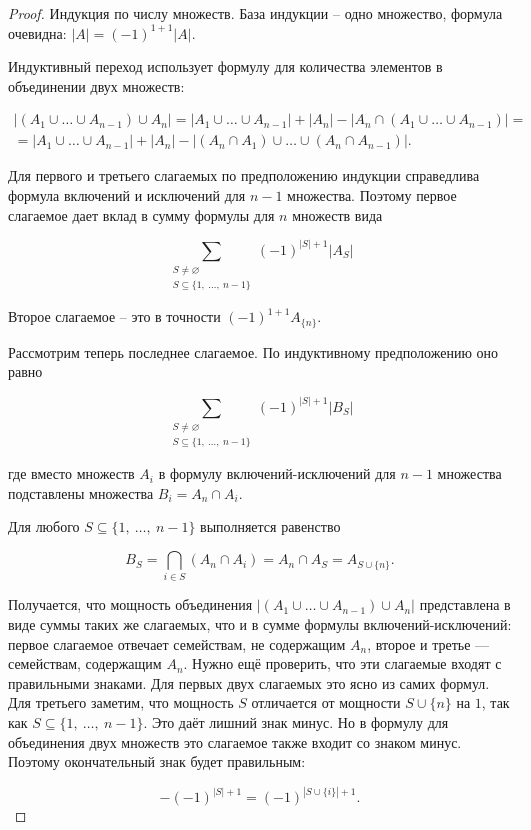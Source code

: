 \documentclass[a4paper, 12pt]{article}
\begin{document}
\begin{proof}
Индукция по числу множеств. База индукции -- одно множество, формула очевидна: $|A| = (-1)^{1 + 1}|A|$.

Индуктивный переход использует формулу для количества элементов в объединении двух множеств:

\begin{multline*}
    |(A_1 \cup \ldots \cup A_{n - 1}) \cup A_n| = |A_1 \cup \ldots \cup A_{n - 1}| + |A_n| - |A_n \cap (A_1 \cup \ldots \cup A_{n - 1})| = \\ = |A_1 \cup \ldots \cup A_{n - 1}| + |A_n| - |(A_n \cap A_1) \cup \ldots \cup (A_n \cap A_{n - 1})|.
\end{multline*}

Для первого и третьего слагаемых по предположению индукции справедлива формула включений и исключений для $n - 1$ множества. Поэтому первое слагаемое дает вклад в сумму формулы для $n$ множеств вида

\[
    \sum_{\substack{S \neq \varnothing \\ S \subseteq \{1,\ \ldots,\ n - 1\}}}(-1)^{|S| + 1}|A_S|
\]

Второе слагаемое -- это в точности $(-1)^{1 + 1}A_{\{n\}}$.

Рассмотрим теперь последнее слагаемое. По индуктивному предположению оно
равно

\[
    \sum_{\substack{S \neq \varnothing \\ S \subseteq \{1,\ \ldots,\ n - 1\}}}(-1)^{|S| + 1}|B_S|
\]

где вместо множеств $A_i$ в формулу включений-исключений для $n - 1$ множества
подставлены множества $B_i = A_n \cap A_i$.

Для любого $S \subseteq \{1,\ \ldots,\ n - 1\}$ выполняется равенство

\[
    B_S = \bigcap\limits_{i \in S}(A_n \cap A_i) = A_n \cap A_S = A_{S\cup\{n\}}.
\]

Получается, что мощность объединения $|(A_1 \cup \ldots \cup A_{n - 1}) \cup A_n|$ представлена в виде суммы таких же слагаемых, что и в сумме формулы включений-исключений: первое слагаемое отвечает семействам, не содержащим $A_n$, второе и третье — семействам, содержащим $A_n$. Нужно ещё проверить, что эти слагаемые входят с правильными знаками. Для первых двух слагаемых это ясно из самих формул. Для третьего заметим, что мощность $S$ отличается от мощности $S \cup \{n\}$ на $1$, так как $S \subseteq \{1,\ \ldots,\ n - 1\}$. Это даёт лишний знак минус. Но в формулу для объединения двух множеств это слагаемое также входит со знаком минус. Поэтому окончательный знак будет правильным:

\[
    -(-1)^{|S|+1} = (-1)^{|S\cup\{i\}| + 1}.
\]

\end{proof}
\end{document}
